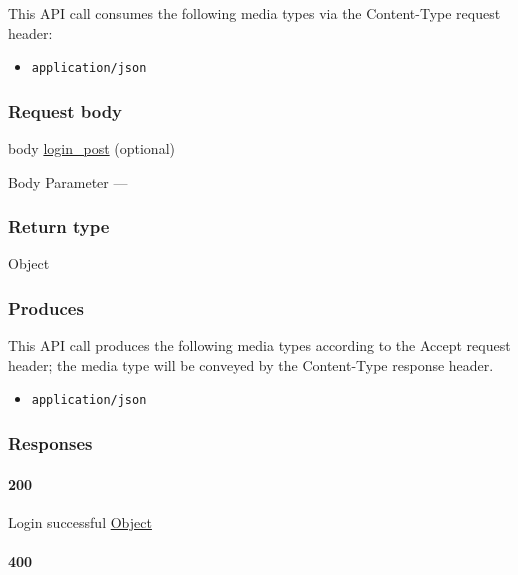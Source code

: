 This API call consumes the following media types via the {Content-Type}
request header:

\begin{itemize}
\tightlist
\item
  \texttt{application/json}
\end{itemize}

\hypertarget{request-body-52}{%
\subsubsection{Request body}\label{request-body-52}}

body \protect\hyperlink{login_post}{login\_post} (optional)

{Body Parameter} ---

\hypertarget{return-type-126}{%
\subsubsection{Return type}\label{return-type-126}}

Object

\hypertarget{produces-160}{%
\subsubsection{Produces}\label{produces-160}}

This API call produces the following media types according to the
{Accept} request header; the media type will be conveyed by the
{Content-Type} response header.

\begin{itemize}
\tightlist
\item
  \texttt{application/json}
\end{itemize}

\hypertarget{responses-165}{%
\subsubsection{Responses}\label{responses-165}}

\hypertarget{section-532}{%
\paragraph{200}\label{section-532}}

Login successful \protect\hyperlink{Object}{Object}

\hypertarget{section-533}{%
\paragraph{400}\label{section-533}}

